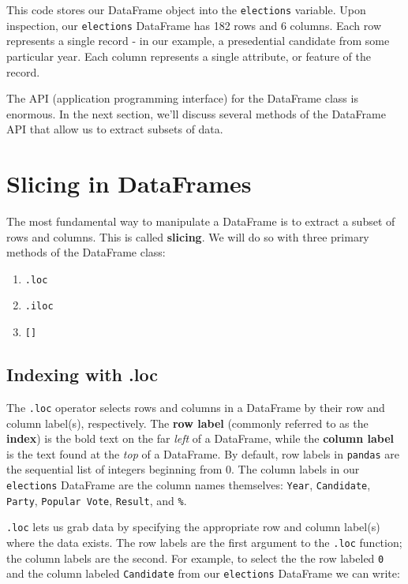 \documentclass[
  letterpaper,
  DIV=11,
  numbers=noendperiod]{scrreprt}
\providecommand{\tightlist}{%
  \setlength{\itemsep}{0pt}\setlength{\parskip}{0pt}}\usepackage{longtable,booktabs,array}
\begin{document}
This code stores our DataFrame object into the \texttt{elections}
variable. Upon inspection, our \texttt{elections} DataFrame has 182 rows
and 6 columns. Each row represents a single record - in our example, a
presedential candidate from some particular year. Each column represents
a single attribute, or feature of the record.

The API (application programming interface) for the DataFrame class is
enormous. In the next section, we'll discuss several methods of the
DataFrame API that allow us to extract subsets of data.

\hypertarget{slicing-in-dataframes}{%
\section{Slicing in DataFrames}\label{slicing-in-dataframes}}

The most fundamental way to manipulate a DataFrame is to extract a
subset of rows and columns. This is called \textbf{slicing}. We will do
so with three primary methods of the DataFrame class:

\begin{enumerate}
\def\labelenumi{\arabic{enumi}.}
\tightlist
\item
  \texttt{.loc}
\item
  \texttt{.iloc}
\item
  \texttt{{[}{]}}
\end{enumerate}

\hypertarget{indexing-with-.loc}{%
\subsection{Indexing with .loc}\label{indexing-with-.loc}}

The \texttt{.loc} operator selects rows and columns in a DataFrame by
their row and column label(s), respectively. The \textbf{row label}
(commonly referred to as the \textbf{index}) is the bold text on the far
\emph{left} of a DataFrame, while the \textbf{column label} is the text
found at the \emph{top} of a DataFrame. By default, row labels in
\texttt{pandas} are the sequential list of integers beginning from 0.
The column labels in our \texttt{elections} DataFrame are the column
names themselves: \texttt{Year}, \texttt{Candidate}, \texttt{Party},
\texttt{Popular\ Vote}, \texttt{Result}, and \texttt{\%}.

\texttt{.loc} lets us grab data by specifying the appropriate row and
column label(s) where the data exists. The row labels are the first
argument to the \texttt{.loc} function; the column labels are the
second. For example, to select the the row labeled \texttt{0} and the
column labeled \texttt{Candidate} from our \texttt{elections} DataFrame
we can write:
\end{document}
